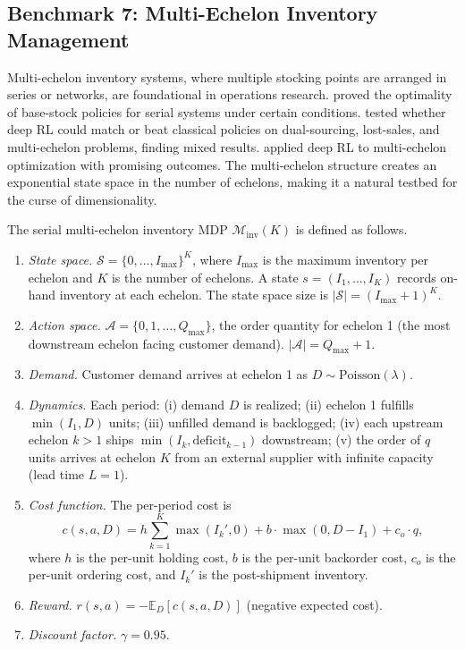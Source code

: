 \subsection{Benchmark 7: Multi-Echelon Inventory Management}
\label{sec:benchmark_inventory}

Multi-echelon inventory systems, where multiple stocking points are arranged in series or networks, are foundational in operations research. \citet{ClarkScarf1960inventory} proved the optimality of base-stock policies for serial systems under certain conditions. \citet{Gijsbrechts2022inventory} tested whether deep RL could match or beat classical policies on dual-sourcing, lost-sales, and multi-echelon problems, finding mixed results. \citet{vanHezewijk2023inventory} applied deep RL to multi-echelon optimization with promising outcomes. The multi-echelon structure creates an exponential state space in the number of echelons, making it a natural testbed for the curse of dimensionality.

\begin{definition}
\label{def:inventory_mdp}
The serial multi-echelon inventory MDP $\mathcal{M}_{\mathrm{inv}}(K)$ is defined as follows.
\begin{enumerate}
    \item \emph{State space.} $\mathcal{S} = \{0, \ldots, I_{\max}\}^K$, where $I_{\max}$ is the maximum inventory per echelon and $K$ is the number of echelons. A state $s = (I_1, \ldots, I_K)$ records on-hand inventory at each echelon. The state space size is $|\mathcal{S}| = (I_{\max} + 1)^K$.
    \item \emph{Action space.} $\mathcal{A} = \{0, 1, \ldots, Q_{\max}\}$, the order quantity for echelon 1 (the most downstream echelon facing customer demand). $|\mathcal{A}| = Q_{\max} + 1$.
    \item \emph{Demand.} Customer demand arrives at echelon 1 as $D \sim \mathrm{Poisson}(\lambda)$.
    \item \emph{Dynamics.} Each period: (i) demand $D$ is realized; (ii) echelon 1 fulfills $\min(I_1, D)$ units; (iii) unfilled demand is backlogged; (iv) each upstream echelon $k > 1$ ships $\min(I_k, \text{deficit}_{k-1})$ downstream; (v) the order of $q$ units arrives at echelon $K$ from an external supplier with infinite capacity (lead time $L = 1$).
    \item \emph{Cost function.} The per-period cost is
    \begin{equation}
    \label{eq:inventory_cost}
    c(s, a, D) = h \sum_{k=1}^{K} \max(I_k', 0) + b \cdot \max(0, D - I_1) + c_o \cdot q,
    \end{equation}
    where $h$ is the per-unit holding cost, $b$ is the per-unit backorder cost, $c_o$ is the per-unit ordering cost, and $I_k'$ is the post-shipment inventory.
    \item \emph{Reward.} $r(s, a) = -\mathbb{E}_D[c(s, a, D)]$ (negative expected cost).
    \item \emph{Discount factor.} $\gamma = 0.95$.
\end{enumerate}
\end{definition}

